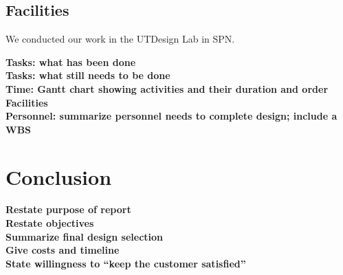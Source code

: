 \documentclass[letterpaper,12pt]{article}
\newcommand{\xxx}[1]{{\color{red}\bf #1}}
\begin{document}
\subsection{Facilities}
We conducted our work in the UTDesign Lab in SPN.

\xxx{Tasks: what has been done} \\
\xxx{Tasks: what still needs to be done} \\
\xxx{Time: Gantt chart showing activities and their duration and order} \\
\xxx{Facilities} \\
\xxx{Personnel: summarize personnel needs to complete design; include a WBS}

\section{Conclusion}
\label{sec:conclusion}

\xxx{Restate purpose of report} \\
\xxx{Restate objectives} \\
\xxx{Summarize final design selection} \\
\xxx{Give costs and timeline} \\
\xxx{State willingness to ``keep the customer satisfied''}
\end{document}
